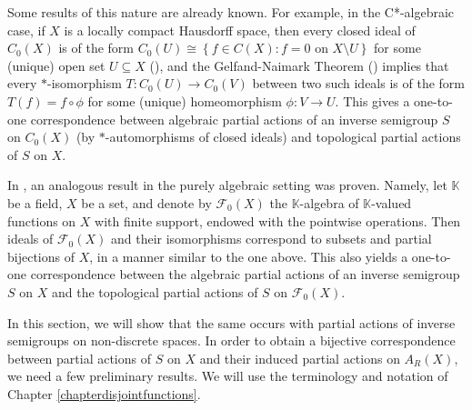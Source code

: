 
Some results of this nature are already known. For example, in the C*-algebraic case, if $X$ is a locally compact Hausdorff space, then every closed ideal of $C_0(X)$ is of the form $C_0(U)\cong\left\{f\in C(X):f=0\text{ on }X\setminus U\right\}$ for some (unique) open set $U\subseteq X$ (\cite[Exercise 3.2.3(5)]{MR1646508}), and the Gelfand-Naimark Theorem (\cite[Theorem 2.1.10]{MR1074574}) implies that every $*$-isomorphism $T:C_0(U)\to C_0(V)$ between two such ideals is of the form $T(f)=f\circ\phi$ for some (unique) homeomorphism $\phi:V\to U$. This gives a one-to-one correspondence between algebraic partial actions of an inverse semigroup $S$ on $C_0(X)$ (by $*$-automorphisms of closed ideals) and topological partial actions of $S$ on $X$.

In \cite{MR3506079}, an analogous result in the purely algebraic setting was proven. Namely, let $\mathbb{K}$ be a field, $X$ be a set, and denote by $\mathcal{F}_0(X)$ the $\mathbb{K}$-algebra of $\mathbb{K}$-valued functions on $X$ with finite support, endowed with the pointwise operations. Then ideals of $\mathcal{F}_0(X)$ and their isomorphisms correspond to subsets and partial bijections of $X$, in a manner similar to the one above. This also yields a one-to-one correspondence between the algebraic partial actions of an inverse semigroup $S$ on $X$ and the topological partial actions of $S$ on $\mathcal{F}_0(X)$. 

In this section, we will show that the same occurs with partial actions of inverse semigroups on non-discrete spaces. %
%
In order to obtain a bijective correspondence between partial actions of $S$ on $X$ and their induced partial actions on $A_R(X)$, we need a few preliminary results. We will use the terminology and notation of Chapter \ref{chapterdisjointfunctions}.

